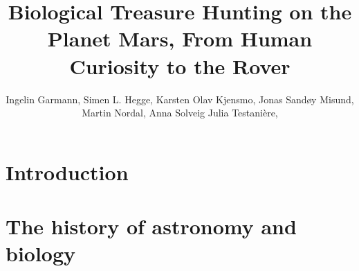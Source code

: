 \documentclass[DIV=calc, paper=a4, fontsize=12pt]{scrartcl}	 %
\title{Biological Treasure Hunting on the Planet Mars,
From Human Curiosity to the Rover} %
\author{Ingelin Garmann, Simen L. Hegge, Karsten Olav Kjensmo, Jonas Sandøy Misund, Martin Nordal, Anna Solveig Julia Testani\`{e}re, } %
\date{} %
\begin{document}
\maketitle %

\thispagestyle{fancy} %





\pagebreak
\tableofcontents


\pagebreak
\section{Introduction}

\begin{multicols}{2}



\end{multicols}


\pagebreak

\section{The history of astronomy and biology}

\begin{multicols}{2}



\end{multicols}



\begin{multicols}{2}

\end{multicols}
\end{document}

